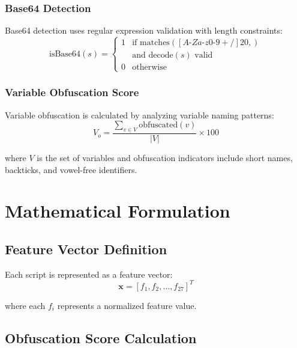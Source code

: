 \documentclass[10pt,conference,a4paper]{IEEEtran}
\begin{document}
\subsubsection{Base64 Detection}

Base64 detection uses regular expression validation with length constraints:
\begin{equation}
\text{isBase64}(s) = \begin{cases}
1 & \text{if } \text{matches}([A\text{-}Za\text{-}z0\text{-}9+/]{20,}) \\
  & \text{and } \text{decode}(s) \text{ valid} \\
0 & \text{otherwise}
\end{cases}
\label{eq:base64}
\end{equation}

\subsubsection{Variable Obfuscation Score}

Variable obfuscation is calculated by analyzing variable naming patterns:
\begin{equation}
V_o = \frac{\sum_{v \in V} \text{obfuscated}(v)}{|V|} \times 100
\label{eq:varobf}
\end{equation}

where $V$ is the set of variables and obfuscation indicators include short names, backticks, and vowel-free identifiers.

\section{Mathematical Formulation}

\subsection{Feature Vector Definition}

Each script is represented as a feature vector:
\begin{equation}
\mathbf{x} = [f_1, f_2, \ldots, f_{27}]^T
\label{eq:featurevector}
\end{equation}

where each $f_i$ represents a normalized feature value.

\subsection{Obfuscation Score Calculation}
\end{document}

